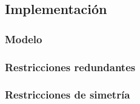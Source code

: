 
\subsection{Implementación}\label{sec:01-jobshop_tardanza-implementacion}

\subsubsection*{Modelo}

\subsubsection*{Restricciones redundantes}

\subsubsection*{Restricciones de simetría}
